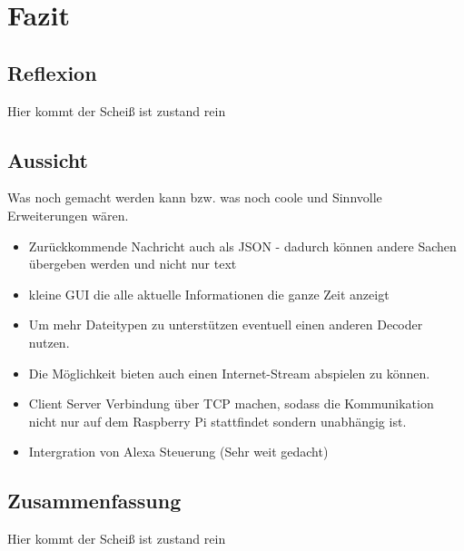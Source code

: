 
\chapter{Fazit}



\section{Reflexion}
Hier kommt der Scheiß ist zustand rein

\section{Aussicht}
Was noch gemacht werden kann bzw. was noch coole und Sinnvolle Erweiterungen wären.
\begin{itemize}
\item Zurückkommende Nachricht auch als JSON - dadurch können andere Sachen übergeben werden und nicht nur text
\item kleine GUI die alle aktuelle Informationen die ganze Zeit anzeigt
\item Um mehr Dateitypen zu unterstützen eventuell einen anderen Decoder nutzen.
\item Die Möglichkeit bieten auch einen Internet-Stream abspielen zu können.
\item Client Server Verbindung über TCP machen, sodass die Kommunikation nicht nur auf dem Raspberry Pi stattfindet sondern unabhängig ist.
\item Intergration von Alexa Steuerung (Sehr weit gedacht)
\end{itemize}

\section{Zusammenfassung}
Hier kommt der Scheiß ist zustand rein

